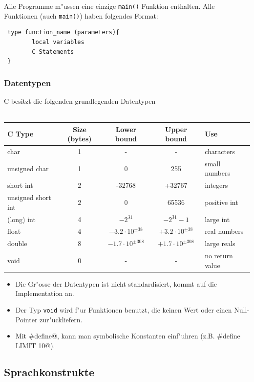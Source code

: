 \documentclass[german, 10pt, a4paper, twocolumn]{scrartcl}
\begin{document}
Alle Programme m"ussen eine einzige \verb#main()# Funktion enthalten. Alle Funktionen (auch \verb#main()#) haben folgendes Format:
\begin{verbatim}
 type function_name (parameters){
        local variables
        C Statements
 }
\end{verbatim}

\subsubsection{Datentypen}

C besitzt die folgenden grundlegenden Datentypen\\\\
\tiny
\begin{tabular}{|l|c|c|c|l|}
 \hline
 C Type &		Size (bytes) &		Lower bound &	Upper bound &	Use \\ \hline\hline
 char &			1 &			- &		- &		characters\\ \hline
 unsigned char &	1 &			0 &		255 &		small numbers\\ \hline
 short int &		2 &			-32768 &	+32767 &	integers \\ \hline
 unsigned short int &	2 &			0 &		65536 &		positive int \\ \hline
 (long) int &		4 &			$-2^{31}$ &	$-2^{31}-1$ &	large int \\ \hline
 float &		4 &			$-3.2\cdotp10^{\pm 38}$ &	$+3.2\cdotp10^{\pm 38}$ &	real numbers \\ \hline
 double &		8 &			$-1.7\cdotp10^{\pm 308}$ &	$+1.7\cdotp10^{\pm 308}$ &	large reals \\ \hline
 void &			0 &			- &		- &		no return value \\ \hline
\end{tabular}
\normalsize

\begin{itemize}
	\item Die Gr"osse der Datentypen ist nicht standardisiert, kommt auf die Implementation an.
	\item Der Typ \verb#void# wird f"ur Funktionen benutzt, die keinen Wert oder einen Null-Pointer zur"uckliefern.
	\item Mit \verb@#define@, kann man symbolische Konstanten einf"uhren (z.B. \verb@#define LIMIT 10@).
\end{itemize}

\subsection{Sprachkonstrukte}
\end{document}
